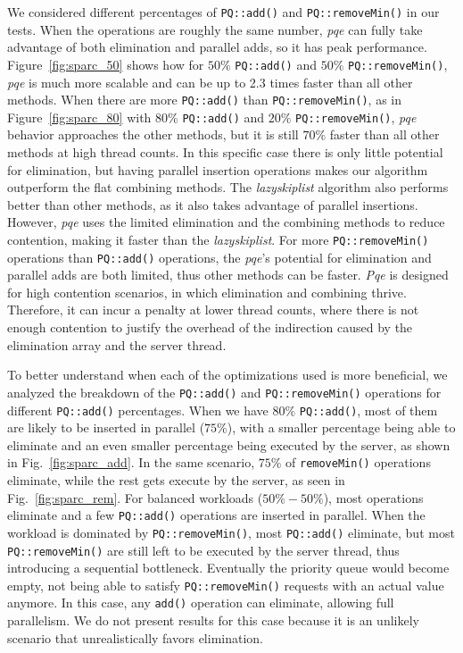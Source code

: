 We considered different percentages of \texttt{PQ::add()} and \texttt{PQ::removeMin()} in our tests. When the operations are roughly the same number, \emph{pqe} can fully take advantage of both elimination and parallel adds, so it has peak performance. Figure~\ref{fig:sparc_50} shows how for $50\%$ \texttt{PQ::add()} and $50\%$ \texttt{PQ::removeMin()}, \emph{pqe} is much more scalable and can be up to 2.3 times faster than all other methods. When there are more \texttt{PQ::add()} than \texttt{PQ::removeMin()}, as in Figure~\ref{fig:sparc_80} with $80\%$ \texttt{PQ::add()} and $20\%$ \texttt{PQ::removeMin()}, \emph{pqe} behavior approaches the other methods, but it is still $70\%$ faster than all other methods at high thread counts. In this specific case there is only little potential for elimination, but having parallel insertion operations makes our algorithm outperform the flat combining methods. The \emph{lazyskiplist} algorithm also performs better than other methods, as it also takes advantage of parallel insertions. However, \emph{pqe} uses the limited elimination and the combining methods to reduce contention, making it faster than the \emph{lazyskiplist}. For more \texttt{PQ::removeMin()} operations than \texttt{PQ::add()} operations, the \emph{pqe}'s potential for elimination and parallel adds are both limited, thus other methods can be faster. \emph{Pqe} is designed for high contention scenarios, in which elimination and combining thrive. Therefore, it can incur a penalty at lower thread counts, where there is not enough contention to justify the overhead of the indirection caused by the elimination array and the server thread. 

To better understand when each of the optimizations used is more beneficial, we analyzed the breakdown of the \texttt{PQ::add()} and \texttt{PQ::removeMin()} operations for different \texttt{PQ::add()} percentages. When we have $80\%$ \texttt{PQ::add()}, most of them are likely to be inserted in parallel ($75\%$), with a smaller percentage being able to eliminate and an even smaller percentage being executed by the server, as shown in Fig.~\ref{fig:sparc_add}. In the same scenario, $75\%$ of \texttt{removeMin()} operations eliminate, while the rest gets execute by the server, as seen in Fig.~\ref{fig:sparc_rem}. For balanced workloads ($50\%-50\%$), most operations eliminate and a few \texttt{PQ::add()} operations are inserted in parallel. When the workload is dominated by \texttt{PQ::removeMin()}, most \texttt{PQ::add()} eliminate, but most \texttt{PQ::removeMin()} are still left to be executed by the server thread, thus introducing a sequential bottleneck. Eventually the priority queue would become empty, not being able to satisfy \texttt{PQ::removeMin()} requests with an actual value anymore. In this case, any \texttt{add()} operation can eliminate, allowing full parallelism. We do not present results for this case because it is an unlikely scenario that unrealistically favors elimination. 
